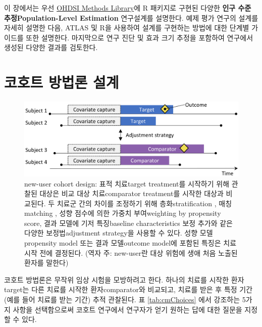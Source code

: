 \documentclass[10.5pt]{book}
\theoremstyle{definition}
\theoremstyle{definition}
\theoremstyle{definition}
\theoremstyle{remark}
\begin{document}
이 장에서는 우선 \href{https://ohdsi.github.io/MethodsLibrary/}{OHDSI
Methods Library}에 R 패키지로 구현된 다양한 \textbf{인구 수준
추정Population-Level Estimation} 연구설계를 설명한다. 예제 평가 연구의
설계를 자세히 설명한 다음, ATLAS 및 R을 사용하여 설계를 구현하는 방법에
대한 단계별 가이드를 또한 설명한다. 마지막으로 연구 진단 및 효과 크기
추정을 포함하여 연구에서 생성된 다양한 결과를 검토한다.

\section{코호트 방법론 설계}\label{CohortMethod}


\begin{figure}

{\centering \includegraphics[width=0.9\linewidth]{images/PopulationLevelEstimation/cohortMethod} 

}

\caption{new-user cohort design: 표적 치료target treatment를 시작하기 위해 관찰된 대상은 비교 대상 치료comparator treatment를 시작한 대상과 비교된다. 두 치료군 간의 차이를 조정하기 위해 층화stratification , 매칭matching , 성향 점수에 의한 가중치 부여weighting by propensity score, 결과 모델에 기저 특징baseline characteristics 보정 추가와 같은 다양한 보정법adjustment strategy을 사용할 수 있다. 성향 모델propensity model 또는 결과 모델outcome model에 포함된 특징은 치료 시작 전에 결정된다. (역자 주: new-user란 대상 위험에 생애 처음 노출된 환자를 말한다) }\label{fig:cohortMethod}
\end{figure}

코호트 방법론은 무작위 임상 시험을 모방하려고 한다. \citep{hernan_2016}
하나의 치료를 시작한 환자target는 다른 치료를 시작한 환자comparator와
비교되고, 치료를 받은 후 특정 기간 (예를 들어 치료를 받는 기간) 추적
관찰된다. 표 \ref{tab:cmChoices} 에서 강조하는 5가지 사항을 선택함으로써
코호트 연구에서 연구자가 얻기 원하는 답에 대한 질문을 지정할 수 있다.
 
\end{document}
